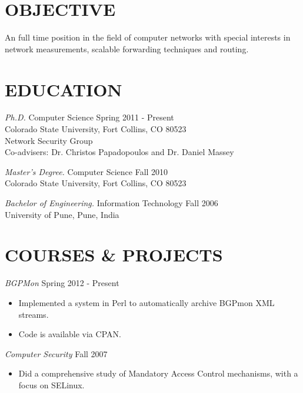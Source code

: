 \documentclass[line,margin]{res}
\begin{document}
\address{37887 Benchmark Ct., Fremont CA 94536}
\address{Email: kaustubh.gadkari@gmail.com \\
Phone: +1-970-261-1699}


\begin{resume}

\section{OBJECTIVE}
 An full time position in the field of computer networks with special
               interests in network measurements, scalable forwarding
               techniques and routing.


\section{EDUCATION}
                {\sl Ph.D.} Computer Science \hfill Spring 2011 - Present\\
                    Colorado State University, Fort Collins, CO 80523\\
                    Network Security Group\\
                    Co-advisers: Dr. Christos Papadopoulos and Dr. Daniel Massey

                {\sl Master's Degree.} Computer Science \hfill Fall 2010\\
                    Colorado State University, Fort Collins, CO 80523

                {\sl Bachelor of Engineering.} Information Technology \hfill Fall 2006\\
                	  University of Pune, Pune, India

\section{COURSES \& PROJECTS}
					{\sl BGPMon} \hfill Spring 2012 - Present
				\begin{itemize} \itemsep -2pt
							\item Implemented a system in Perl to automatically archive BGPmon XML streams.
							\item Code is available via CPAN.
						\end{itemize}

					{\sl Computer Security} \hfill Fall 2007
						\begin{itemize} \itemsep -2pt
						\item Did a comprehensive study of Mandatory Access Control mechanisms, with a focus on SELinux.
						\end{itemize}


\end{resume}
\end{document}
